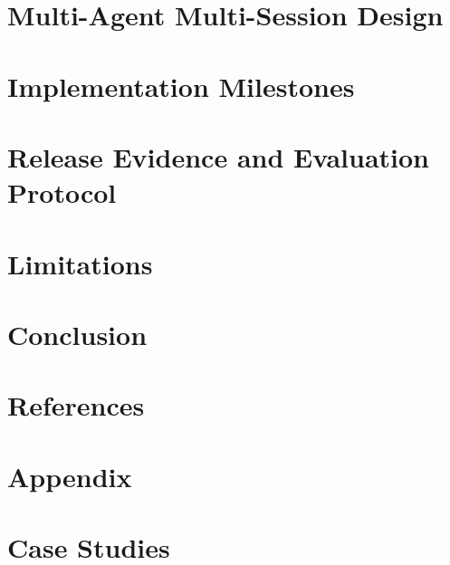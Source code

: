\documentclass[11pt,letterpaper]{article}
\begin{document}
\section{Multi-Agent Multi-Session Design}


\section{Implementation Milestones}
\label{sec:milestones}


\section{Release Evidence and Evaluation Protocol}
\label{sec:release-evidence}


\section{Limitations}


\section{Conclusion}


\clearpage
\section*{References}
\renewcommand{\bibsection}{}



\clearpage
\appendix
\section*{Appendix}

\section{Case Studies}
\label{app:case-studies}


% 
\end{document}
